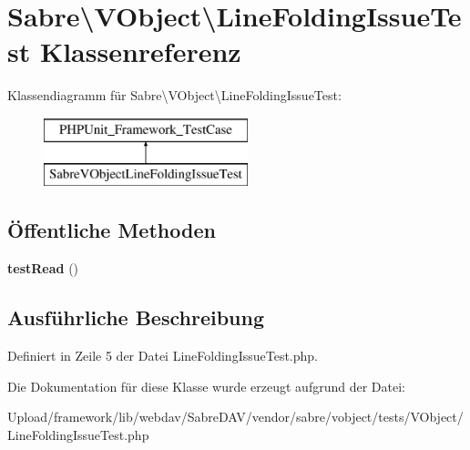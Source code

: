 \hypertarget{class_sabre_1_1_v_object_1_1_line_folding_issue_test}{}\section{Sabre\textbackslash{}V\+Object\textbackslash{}Line\+Folding\+Issue\+Test Klassenreferenz}
\label{class_sabre_1_1_v_object_1_1_line_folding_issue_test}
Klassendiagramm für Sabre\textbackslash{}V\+Object\textbackslash{}Line\+Folding\+Issue\+Test\+:\begin{figure}[H]
\begin{center}
\leavevmode
\includegraphics[height=2.000000cm]{class_sabre_1_1_v_object_1_1_line_folding_issue_test}
\end{center}
\end{figure}
\subsection*{Öffentliche Methoden}
\begin{DoxyCompactItemize}
\item 
\mbox{\label{class_sabre_1_1_v_object_1_1_line_folding_issue_test_a4fefb853bb47cc09326853cf27cbce90}} 
{\bfseries test\+Read} ()
\end{DoxyCompactItemize}


\subsection{Ausführliche Beschreibung}


Definiert in Zeile 5 der Datei Line\+Folding\+Issue\+Test.\+php.



Die Dokumentation für diese Klasse wurde erzeugt aufgrund der Datei\+:\begin{DoxyCompactItemize}
\item 
Upload/framework/lib/webdav/\+Sabre\+D\+A\+V/vendor/sabre/vobject/tests/\+V\+Object/Line\+Folding\+Issue\+Test.\+php\end{DoxyCompactItemize}
